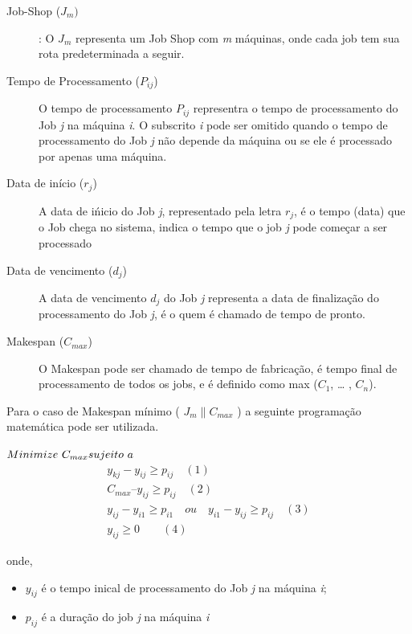 \begin{description}

\item [Job-Shop ($J_{m})$]: O $J_m$ representa um Job Shop com {\it m} máquinas, onde cada job tem sua rota predeterminada a seguir.

\item [Tempo de Processamento ($P_{ij}$)] O tempo de processamento $P_{ij}$ representra o tempo de processamento do Job {\it j} na máquina {\it i}. O subscrito {\it i} pode ser omitido quando o tempo de processamento do Job {\it j} não depende da máquina ou se ele é processado por apenas uma máquina.

\item [Data de início ($r_j$)] A data de ińicio do Job {\it j}, representado pela letra $r_j$, é o tempo (data) que o Job chega no sistema, indica o tempo que o job {\it j} pode começar a ser processado

\item [Data de vencimento ($d_j$)] A data de vencimento $d_j$ do Job {\it j} representa a data de finalização do processamento do Job {\it j}, é o quem é chamado de tempo de pronto.

\item [Makespan ($C_{max}$)] O Makespan pode ser chamado de tempo de fabricação, é tempo final de processamento de todos os jobs, e é definido como max ($C_1$, … , $C_n$).
\end{description}

Para o caso de Makespan mínimo ( $J_m \parallel C_{max}$ ) a seguinte programação matemática pode ser utilizada.

$\\Minimize\ C_{max}\\ \\
sujeito\ a$
\begin{eqnarray*}
        y_{kj}-y_{ij}\geq p_{ij}   \quad (1)\\
        C_{max} – y_{ij}\geq p_{ij} \quad (2)\\
        y_{ij}-y_{i1}\geq p_{i1}\quad ou \quad y_{i1}-y_{ij}\geq p_{ij} \quad (3) \\
         y_{ij}\geq 0 \qquad (4)
\end{eqnarray*}


onde,
\begin{itemize}

\item $y_{ij}$ é o tempo inical de processamento do Job {\it j} na máquina {\it i};
\item $p_{ij}$ é a duração do job {\it j} na máquina {\it i}

\end{itemize}

